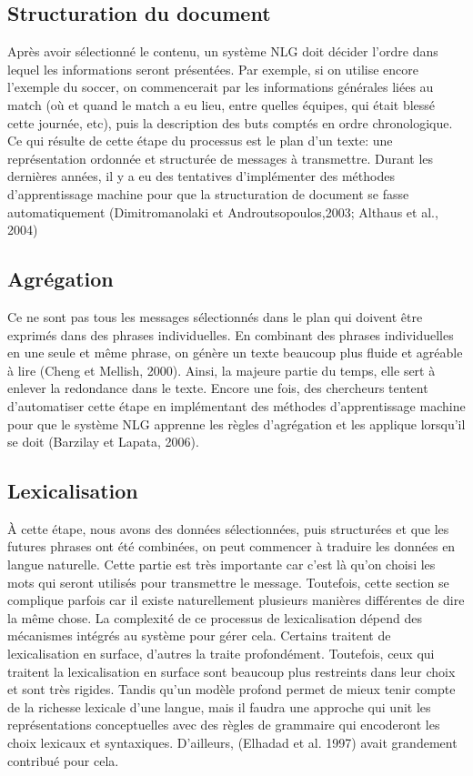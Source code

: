 \subsection{Structuration du document}
Après avoir sélectionné le contenu, un système NLG doit décider l'ordre dans lequel les informations seront présentées. Par exemple, si on utilise encore l'exemple du soccer, on commencerait par les informations générales liées au match (où et quand le match a eu lieu, entre quelles équipes, qui était blessé cette journée, etc), puis la description des buts comptés en ordre chronologique. Ce qui résulte de cette étape du processus est le plan d'un texte: une représentation ordonnée et structurée de messages à transmettre. Durant les dernières années, il y a eu des tentatives d'implémenter des méthodes d'apprentissage machine pour que la structuration de document se fasse automatiquement (Dimitromanolaki et Androutsopoulos,2003; Althaus et al., 2004)

\subsection{Agrégation}
Ce ne sont pas tous les messages sélectionnés dans le plan qui doivent être exprimés dans des phrases individuelles. En combinant des phrases individuelles en une seule et même phrase, on génère un texte beaucoup plus fluide et agréable à lire (Cheng et Mellish, 2000). Ainsi, la majeure partie du temps, elle sert à enlever la redondance dans le texte. Encore une fois, des chercheurs tentent d'automatiser cette étape en implémentant des méthodes d'apprentissage machine pour que le système NLG apprenne les règles d'agrégation et les applique lorsqu'il se doit (Barzilay et Lapata, 2006).

\subsection{Lexicalisation}
À cette étape, nous avons des données sélectionnées, puis structurées et que les futures phrases ont été combinées, on peut commencer à traduire les données en langue naturelle. Cette partie est très importante car c'est là qu'on choisi les mots qui seront utilisés pour transmettre le message. Toutefois, cette section se complique parfois car il existe naturellement plusieurs manières différentes de dire la même chose. La complexité de ce processus de lexicalisation dépend des mécanismes intégrés au système pour gérer cela. Certains traitent de lexicalisation en surface, d'autres la traite profondément. Toutefois, ceux qui traitent la lexicalisation en surface sont beaucoup plus restreints dans leur choix et sont très rigides. Tandis qu'un modèle profond permet de mieux tenir compte de la richesse lexicale d'une langue, mais il faudra une approche qui unit les représentations conceptuelles avec des règles de grammaire qui encoderont les choix lexicaux et syntaxiques. D'ailleurs, (Elhadad et al. 1997) avait grandement contribué pour cela.


